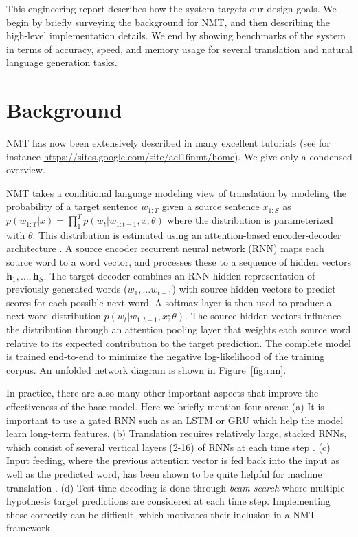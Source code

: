 \documentclass[]{article}
\begin{document}
This engineering report describes how the system targets our design
goals. We begin by briefly surveying the background for NMT, and then
describing the high-level implementation details. We end by showing
benchmarks of the system in terms of accuracy, speed, and memory usage
for several translation and natural language generation tasks.

\section{Background}

NMT has now been extensively described in many
excellent tutorials (see for instance
\url{https://sites.google.com/site/acl16nmt/home}). We give only
a condensed overview.

NMT takes a conditional language modeling view of translation by modeling the
probability of a target sentence $w_{1:T}$ given a source sentence
$x_{1:S}$ as
$p(w_{1:T}| x) = \prod_{1}^T p(w_t| w_{1:t-1}, x; \theta)$ where the 
distribution is parameterized with $\theta$.
This
distribution is estimated using an attention-based encoder-decoder
architecture \citep{Bahdanau2015}. A source encoder recurrent neural
network (RNN) maps each source word to a word vector, and processes
these to a sequence of hidden vectors
$\mathbf{h}_1, \ldots, \mathbf{h}_S$.  The target decoder combines an
RNN hidden representation of previously generated words
($w_1, ... w_{t-1}$) with source hidden vectors to predict scores for
each possible next word. A softmax layer is then used to produce a
next-word distribution $ p(w_t| w_{1:t-1}, x; \theta)$. The source
hidden vectors influence the distribution through an attention pooling
layer that weights each source word relative to its expected
contribution to the target prediction. The complete model is trained
end-to-end to minimize the negative log-likelihood of the training
corpus. An unfolded network diagram is shown in Figure~\ref{fig:rnn}.


In practice, there are also many other important aspects that improve
the effectiveness of the base model. Here we briefly mention four
areas: (a) It is important to use a gated RNN such as an LSTM
\citep{hochreiter1997long} or GRU \citep{chung2014empirical} which help
the model learn long-term features. (b) Translation requires
relatively large, stacked RNNs, which consist of several vertical
layers (2-16) of RNNs at each time step \citep{sutskever14sequence}. (c)
Input feeding, where the previous attention vector is fed back into
the input as well as the predicted word, has been shown to be quite
helpful for machine translation \citep{Luong2015}.  (d) Test-time
decoding is done through \textit{beam search} where multiple
hypothesis target predictions are considered at each time
step. Implementing these correctly can be difficult, which motivates
their inclusion in a NMT framework.
\end{document}
